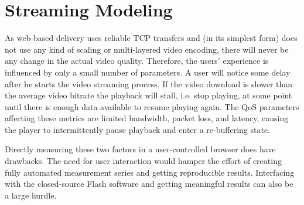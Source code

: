 \section{Streaming Modeling}
\label{c3:sec:modeling}



As web-based delivery uses reliable TCP transfers and (in its simplest form) does not use any kind of scaling or multi-layered video encoding, there will never be any change in the actual video quality. Therefore, the users' experience is influenced by only a small number of parameters. A user will notice some delay after he starts the video streaming process. If the video download is slower than the average video bitrate the playback will stall, i.e. stop playing, at some point until there is enough data available to resume playing again.
The QoS parameters affecting these metrics are limited bandwidth, packet loss, and latency, causing the player to intermittently pause playback and enter a re-buffering state.

Directly measuring these two factors in a user-controlled browser does have drawbacks. The need for user interaction would hamper the effort of creating fully automated measurement series and getting reproducible results. Interfacing with the closed-source Flash software and getting meaningful results can also be a large hurdle.

